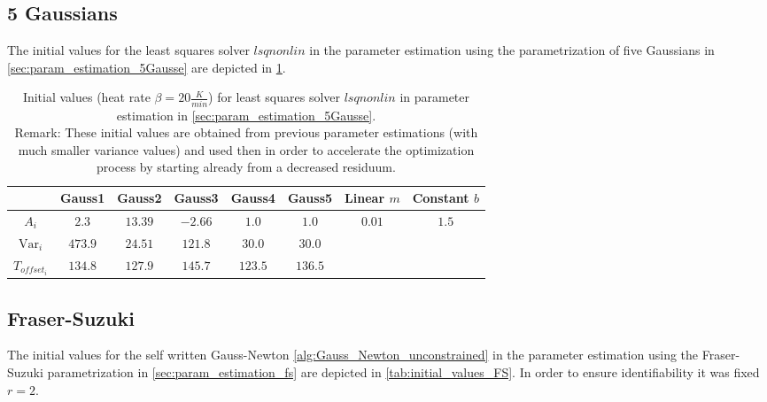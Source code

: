\documentclass{scrartcl}[12pt, halfparskip]
\numberwithin{equation}{section}
\numberwithin{figure}{section}
\numberwithin{table}{section}
\newcommand{\var}{\operatorname{Var}}
\begin{document}
\subsection{5 Gaussians}
\label{sec:initial_values_5Gaussians}

The initial values for the least squares solver $lsqnonlin$ in the parameter estimation using the parametrization of five Gaussians in \cref{sec:param_estimation_5Gausse} are depicted in \cref{tab:initial_values_5Gausse}. 

\begin{table}[H]
	\centering
	\caption{Initial values (heat rate $\beta=20 \frac{K}{min}$) for least squares solver $lsqnonlin$ in parameter estimation in \cref{sec:param_estimation_5Gausse}. \\
		Remark: These initial values are obtained from previous parameter estimations (with much smaller variance values) and used then in order to accelerate the optimization process by starting already from a decreased residuum.}
	\begin{tabular}{| c | c | c | c | c | c || c | c |} \hline
		& Gauss1 & Gauss2 & Gauss3 & Gauss4 & Gauss5 & Linear $m$ & Constant $b$ \\ \hline
		$A_i$ & $2.3$ & $13.39$ & $-2.66$ & $1.0$ & $1.0$ & $0.01$ & $1.5$ \\
		$\var_i$ & $473.9$ & $24.51$ & $121.8$ & $30.0$ & $30.0$ & & \\
		$T_{offset_i}$ & $134.8$ & $127.9$ & $145.7$ & $123.5$ & $136.5$ & & \\ \hline
	\end{tabular}
	\label{tab:initial_values_5Gausse}
\end{table}


\subsection{Fraser-Suzuki}
\label{sec:initial_values_FS}

The initial values for the self written Gauss-Newton \cref{alg:Gauss_Newton_unconstrained} in the parameter estimation using the Fraser-Suzuki parametrization in \cref{sec:param_estimation_fs} are depicted in \cref{tab:initial_values_FS}. In order to ensure identifiability it was fixed $r=2$.
\end{document}
